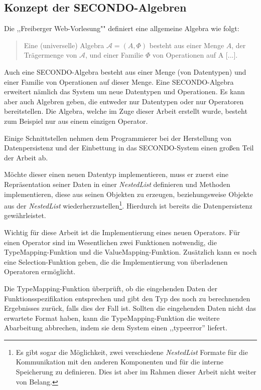 \subsection{Konzept der SECONDO-Algebren}

Die ,,Freiberger Web-Vorlesung"" \cite{Freib} definiert eine allgemeine Algebra wie folgt:

\begin{quotation}
Eine (universelle) Algebra $\mathcal{A} = (A,\Phi)$ besteht aus einer Menge
$A$, der Trägermenge von $\mathcal{A}$, und einer Familie $\Phi$ von Operationen auf A [...].
\end{quotation} 

Auch eine SECONDO-Algebra besteht aus einer Menge (von Datentypen) und einer Familie von Operationen auf dieser Menge. Eine SECONDO-Algebra erweitert nämlich das System um neue Datentypen und Operationen. Es kann aber auch Algebren geben, die entweder nur Datentypen oder nur Operatoren bereitstellen. Die Algebra, welche im Zuge dieser Arbeit erstellt wurde, besteht zum Beispiel nur aus einem einzigen Operator.

Einige Schnittstellen nehmen dem Programmierer bei der Herstellung von Datenpersistenz und der Einbettung in das SECONDO-System  einen großen Teil der Arbeit ab.

Möchte dieser einen neuen Datentyp implementieren, muss er zuerst eine Repräsentation seiner Daten in einer \textit{NestedList} definieren und Methoden implementieren, diese aus seinen Objekten zu erzeugen, beziehungsweise Objekte aus der \textit{NestedList} wiederherzustellen\footnote{Es gibt sogar die Möglichkeit, zwei verschiedene \textit{NestedList} Formate für die Kommunikation mit den anderen Komponenten und für die interne Speicherung zu definieren. Dies ist aber im Rahmen dieser Arbeit nicht weiter von Belang.}. Hierdurch ist bereits die Datenpersistenz gewährleistet.

Wichtig für diese Arbeit ist die Implementierung eines neuen Operators. Für einen Operator sind im Wesentlichen zwei Funktionen notwendig, die TypeMapping-Funktion und die ValueMapping-Funktion. Zusätzlich kann es noch eine Selection-Funktion geben, die die Implementierung von überladenen Operatoren ermöglicht.

Die TypeMapping-Funktion überprüft, ob die eingehenden Daten der Funktionsspezifikation entsprechen und gibt den Typ des noch zu berechnenden Ergebnisses zurück, falls dies der Fall ist. Sollten die eingehenden Daten nicht das erwartete Format haben, kann die TypeMapping-Funktion die weitere Abarbeitung abbrechen, indem sie dem System einen ,,typeerror'' liefert.

